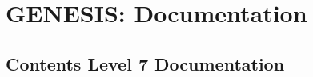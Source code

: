 \documentclass[12pt]{article}
\begin{document}
\section*{GENESIS: Documentation}

\subsection*{Contents Level 7 Documentation}

\end{document}
